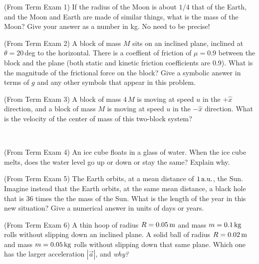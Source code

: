 \documentclass[12pt, letterpaper]{article}
\begin{document}

\begin{problem} (From Term Exam 1)
  If the radius of the Moon is about $1/4$ that of the Earth,
  and the Moon and Earth are made of similar things,
  what is the mass of the Moon?
  Give your answer as a number in kg. No need to be precise!
\end{problem}

\vfill

\begin{problem} (From Term Exam 2)
  A block of mass $M$ sits on an inclined plane, inclined at $\theta=20$\,deg to the horizontal.
  There is a coeffient of friction of $\mu = 0.9$ between the block and the plane
  (both static and kinetic friction coefficients are 0.9).
  What is the magnitude of the frictional force on the block?
  Give a symbolic answer in terms of $g$ and any other symbols that appear in this problem.
\end{problem}

\vfill

\begin{problem} (From Term Exam 3)
  A block of mass $4\,M$ is moving at speed $u$ in the $+\hat{x}$ direction,
  and a block of mass $M$ is moving at speed $u$ in the $-\hat{x}$ direction.
  What is the velocity of the center of mass of this two-block system?
\end{problem}

\vfill
~\clearpage

\begin{problem} (From Term Exam 4)
  An ice cube floats in a glass of water.
  When the ice cube melts, does the water level go up or down or stay the same?
  Explain why.
\end{problem}

\vfill

\begin{problem} (From Term Exam 5)
  The Earth orbits, at a mean distance of $1\,\mathrm{a.u.}$, the Sun.
  Imagine instead that the Earth orbits, at the same mean distance, a black hole that is 36 times the the mass of the Sun.
  What is the length of the year in this new situation?
  Give a numerical answer in units of days or years.
\end{problem}

\vfill

\begin{problem} (From Term Exam 6)
  A thin hoop of radius $R=0.05\,\mathrm{m}$ and mass $m=0.1\,\mathrm{kg}$ rolls without slipping down an inclined plane.
  A solid ball of radius $R=0.02\,\mathrm{m}$ and mass $m=0.05\,\mathrm{kg}$ rolls without slipping down that same plane.
  Which one has the larger acceleration $|\vec{a}|$, and \emph{why?}
\end{problem}
\end{document}
